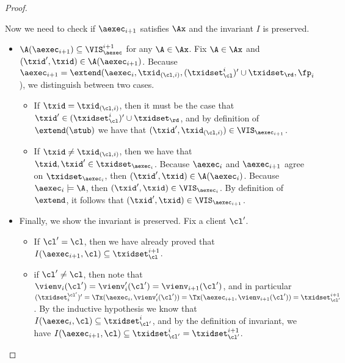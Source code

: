 \begin{proof}
\begin{itemize}
Now we need to check if \( \aexec_{i+1} \) satisfies \( \Ax\) and the invariant \( I \) is preserved.
\begin{itemize}
\item $\A(\aexec_{i+1}) \subseteq \VIS_{\aexec}^{i+1}$ for any $\A \in \Ax$.
Fix $\A \in \Ax$ and $(\txid', \txid) \in \A(\aexec_{i+1})$. 
Because $\aexec_{i+1} = \extend(\aexec_{i}, \txid_{(\cl, i)}, (\txidset_{\cl}^{i})' \cup \txidset_\rd, \fp_{i}$), 
we distinguish between two cases.
\begin{itemize}
\item If $\txid = \txid_{(\cl, i)}$, then it must be the case that $\txid' \in (\txidset^{i}_{\cl})' \cup \txidset_\rd$, 
and by definition of $\extend(\stub)$ we have that $(\txid' ,\txid_{(\cl, i)}) \in \VIS_{\aexec_{i+1}}$. 
\item If $\txid \neq \txid_{(\cl, i)}$, then we have that $\txid, \txid' \in \txidset_{\aexec_{i}}$. 
Because $\aexec_{i}$ and $\aexec_{i+1}$ agree on $\txidset_{\aexec_{i}}$, then $(\txid', \txid) \in \A(\aexec_{i})$.
Because $\aexec_{i} \models \A$, then $(\txid', \txid) \in \VIS_{\aexec_{i}}$. 
By definition of $\extend$, it follows that $(\txid', \txid) \in \VIS_{\aexec_{i+1}}$.
\end{itemize}

\item Finally, we show the invariant is preserved.
Fix a client $\cl'$. 
\begin{itemize}
\item If $\cl' = \cl$, then we have already proved that 
$I(\aexec_{i+1}, \cl) \subseteq \txidset_{\cl}^{i+1}$. 
\item if $\cl' \neq \cl$, then note that $\vienv_{i}(\cl') = \vienv'_{i}(\cl') = \vienv_{i+1}(\cl')$, 
and in particular $(\txidset^{\cl'}_{i})' = \Tx(\aexec_{i}, \vienv'_{i}(\cl')) = \Tx(\aexec_{i+1}, \vienv_{i+1}(\cl')) =  \txidset_{\cl'}^{i+1}$.
By the inductive hypothesis we know that $I(\aexec_{i}, \cl) \subseteq \txidset_{\cl'}^{i}$, 
and by the definition of invariant, we have $I(\aexec_{i+1}, \cl) \subseteq \txidset_{\cl'}^{i} = \txidset_{\cl'}^{i+1}$. 
\end{itemize}
\end{itemize}
\end{itemize}
\end{proof}

